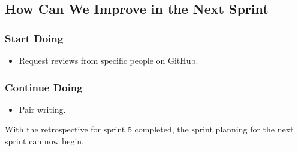 \subsection{How Can We Improve in the Next Sprint}
\subsubsection{Start Doing}
\begin{itemize}
    \item Request reviews from specific people on GitHub.
\end{itemize}
\subsubsection{Continue Doing}
\begin{itemize}
    \item Pair writing.
\end{itemize}

With the retrospective for sprint 5 completed, the sprint planning for the next sprint can now begin. 